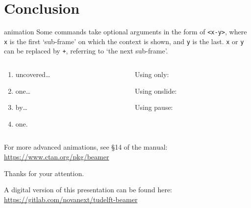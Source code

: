 \documentclass[aspectratio=43]{beamer}
\begin{document}
\section{Conclusion}
\begin{frame}[fragile]{animation}
  \vfill
  Some commands take optional arguments in the form of \verb|<x-y>|,
  where \verb|x| is the first `sub-frame' on which the context is shown,
  and \verb|y| is the last. \verb|x| or \verb|y| can be replaced by \verb|+|,
  referring to `the next sub-frame'. 
  \vfill
  \begin{columns}[onlytextwidth]
  \begin{column}{.5\textwidth}
    \begin{enumerate}
      \item<+-> uncovered\ldots
      \item<+-> one\ldots
      \item<+-> by\ldots
      \item<+-> one.
    \end{enumerate}
    \end{column}
  \begin{column}{.5\textwidth}
      Using only:

      Using onslide:

      Using pause:
  \end{column}
  \end{columns}
  \vfill
  For more advanced animations, see \S 14 of the manual:\\
  \url{https://www.ctan.org/pkg/beamer}
  \vfill
\end{frame}

\begin{frame}
  Thanks for your attention.

  A digital version of this presentation can be found here:
  \vfill
  \url{https://gitlab.com/novanext/tudelft-beamer} 
  \vfill  
  \centering
  \vfill
\end{frame}


\begin{frame}[allowframebreaks,t]{\bibname}
	\AtNextBibliography{\footnotesize}%
	\printbibliography
\end{frame}
\end{document}
